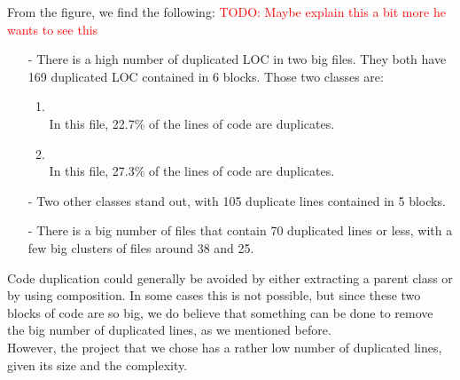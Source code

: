            From the figure, we find the following: 
            \textcolor{red}{TODO: Maybe explain this a bit more he wants to see this}
            \begin{itemize}
                \item[-] There is a high number of duplicated LOC in two big files. They both have 169 duplicated LOC contained in 6 blocks. Those two classes are: 
                \begin{enumerate}
                    \item {}\\
                    In this file, 22.7\% of the lines of code are duplicates. 
                    \item {}\\
                     In this file, 27.3\% of the lines of code are duplicates. 
                \end{enumerate}
                \item[-] Two other classes stand out, with 105 duplicate lines contained in 5 blocks. 
                \item[-] There is a big number of files that contain 70 duplicated lines or less, with a few big clusters of files around 38 and 25. 
 
            \end{itemize}
            Code duplication could generally be avoided by either extracting a parent class or by using composition. In some cases this is not possible, but since these two blocks of code are so big, we do believe that something can be done to remove the big number of duplicated lines, as we mentioned before. \\
            However, the project that we chose has a rather low number of duplicated lines, given its size and the complexity.
         
